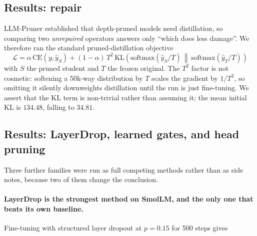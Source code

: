\documentclass[11pt]{article}
\begin{document}
\subsection{Results: repair}
LLM-Pruner established that depth-pruned models need distillation, so
comparing two \emph{unrepaired} operators answers only ``which does less
damage''. We therefore ran the standard pruned-distillation objective
\begin{equation}
\mathcal{L} = \alpha\,\mathrm{CE}(y,\hat y_S) + (1-\alpha)\,T^2\,
\mathrm{KL}\!\left(\mathrm{softmax}(\hat y_S/T)\,\middle\|\,
\mathrm{softmax}(\hat y_T/T)\right)
\end{equation}
with $S$ the pruned student and $T$ the frozen original. The $T^2$ factor is
not cosmetic: softening a 50k-way distribution by $T$ scales the gradient by
$1/T^2$, so omitting it silently downweights distillation until the run is
just fine-tuning. We assert that the KL term is non-trivial rather than
assuming it; the mean initial KL is $134.48$, falling to $34.81$.

\begin{table}[h]
\centering
\small
{}
\caption{Repair by pruned distillation recovers a large fraction of the
perplexity that deletion costs, at no parameter cost beyond the deletion.
Healed beat pruned in 12 of 12 runs, not merely on average.}
\label{tab:heal}
\end{table}

\subsection{Results: LayerDrop, learned gates, and head pruning}
Three further families were run as full competing methods rather than as
side notes, because two of them change the conclusion.

\paragraph{LayerDrop is the strongest method on SmolLM, and the only one that
beats its own baseline.} Fine-tuning with structured layer dropout at
$p=0.15$ for 500 steps gives
\end{document}
